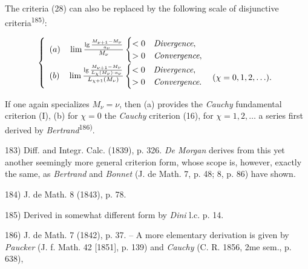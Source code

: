 The criteria (28) can also be replaced by the following scale of disjunctive criteria\textsuperscript{185)}:

\vspace{-0.5cm}
\begin{align}
\left\{
\begin{array}{l}
(a) \quad \lim \frac{\lg \frac{M_{\nu+1} - M_\nu}{a_\nu}}{M_\nu} \begin{cases} < 0 & \textit{Divergence}, \\ > 0 & \textit{Convergence}, \end{cases} \\[1em]
(b) \quad \lim \frac{\lg \frac{M_{\nu+1} - M_\nu}{L_\chi(M_\nu) \cdot a_\nu}}{L_{\chi+1}(M_\nu)} \begin{cases} < 0 & \textit{Divergence}, \\ > 0 & \textit{Convergence}. \end{cases} \raisebox{-0.5ex}{$\quad (\chi = 0, 1, 2, \ldots).$}
\end{array}
\right.
\end{align}

If one again specializes $M_\nu = \nu$, then (a) provides the \textit{Cauchy} fundamental criterion (I), (b) for $\chi = 0$ the \textit{Cauchy} criterion (16), for $\chi = 1, 2, \ldots$ a series first derived by \textit{Bertrand}\textsuperscript{186)}.

\vfill
\leftline{\rule{2in}{0.4pt}}
\vspace{0.2cm}
{
\footnotesize
183) Diff. and Integr. Calc. (1839), p. 326. \textit{De Morgan} derives from this yet another seemingly more general criterion form, whose scope is, however, exactly the same, as \textit{Bertrand} and \textit{Bonnet} (J. de Math. 7, p. 48; 8, p. 86) have shown.

184) J. de Math. 8 (1843), p. 78.

185) Derived in somewhat different form by \textit{Dini} l.c. p. 14.

186) J. de Math. 7 (1842), p. 37. -- A more elementary derivation is given by \textit{Paucker} (J. f. Math. 42 [1851], p. 139) and \textit{Cauchy} (C. R. 1856, 2me sem., p. 638),

}